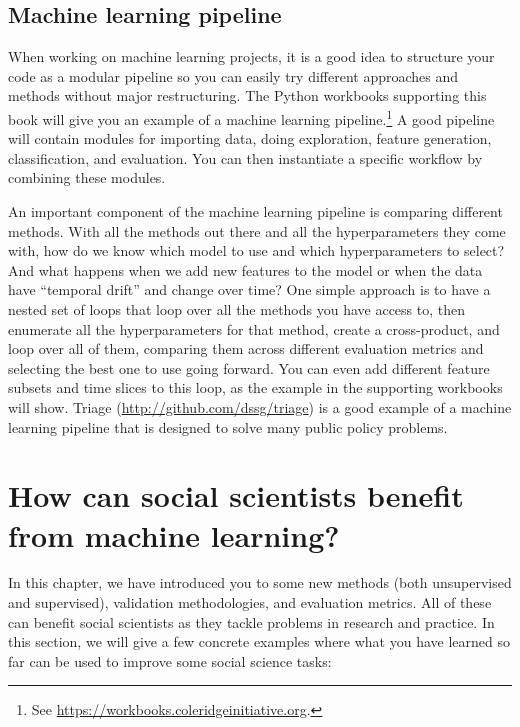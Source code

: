 \documentclass[]{krantz}
\begin{document}
\subsection{Machine learning pipeline}\label{machine-learning-pipeline}

When working on machine learning projects, it is a good idea to
structure your code as a modular pipeline so you can easily try
different approaches and methods without major restructuring. The Python
workbooks supporting this book will give you an example of a machine
learning pipeline.\footnote{See
  \url{https://workbooks.coleridgeinitiative.org}.} A good pipeline will
contain modules for importing data, doing exploration, feature
generation, classification, and evaluation. You can then instantiate a
specific workflow by combining these modules.

An important component of the machine learning pipeline is comparing
different methods. With all the methods out there and all the
hyperparameters they come with, how do we know which model to use and
which hyperparameters to select? And what happens when we add new
features to the model or when the data have ``temporal drift'' and
change over time? One simple approach is to have a nested set of loops
that loop over all the methods you have access to, then enumerate all
the hyperparameters for that method, create a cross-product, and loop
over all of them, comparing them across different evaluation metrics and
selecting the best one to use going forward. You can even add different
feature subsets and time slices to this loop, as the example in the
supporting workbooks will show. Triage
(\url{http://github.com/dssg/triage}) is a good example of a machine
learning pipeline that is designed to solve many public policy problems.

\section{How can social scientists benefit from machine
learning?}\label{how-can-social-scientists-benefit-from-machine-learning}

In this chapter, we have introduced you to some new methods (both
unsupervised and supervised), validation methodologies, and evaluation
metrics. All of these can benefit social scientists as they tackle
problems in research and practice. In this section, we will give a few
concrete examples where what you have learned so far can be used to
improve some social science tasks:
\end{document}
